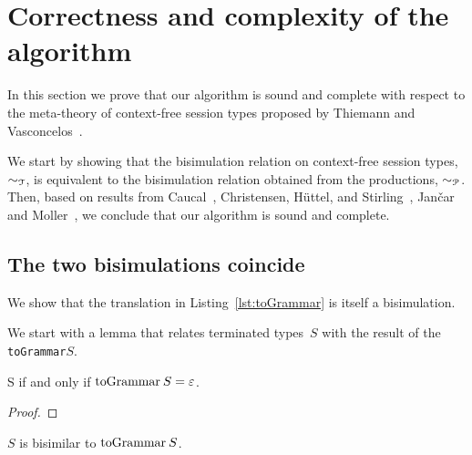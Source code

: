 \section{Correctness and complexity of the algorithm}
\label{sec:soundness}

In this section we prove that our algorithm is sound and complete
with respect to the meta-theory of context-free session types proposed
by Thiemann and Vasconcelos~\cite{thiemann2016context}.

We start by showing that the bisimulation relation on context-free
session types, $\sim_\mathcal T$, is equivalent to the bisimulation
relation obtained from the productions, $\sim_\mathcal P$.  Then, based on
results from Caucal~\cite{caucal1986decidabilite}, Christensen,
H{\"{u}}ttel, and Stirling~\cite{DBLP:journals/iandc/ChristensenHS95},
Jan{\v{c}}ar and Moller~\cite{janvcar1999techniques}, we conclude that
our algorithm is sound and complete.

\subsection{The two bisimulations coincide}

We show that the translation in Listing~\ref{lst:toGrammar} is itself
a bisimulation.

We start with a lemma that relates terminated types~$S$ with the result of
the \lstinline|toGrammar|$S$.

\begin{lemma}
  \label{lem:terminated-togrammar}
  \DONE S if and only if $\toGrammarf{S} = \varepsilon$.
\end{lemma}

\begin{proof}
\end{proof}

\begin{theorem}
  $S$ is bisimilar to $\toGrammarf{S}$.
\end{theorem}

